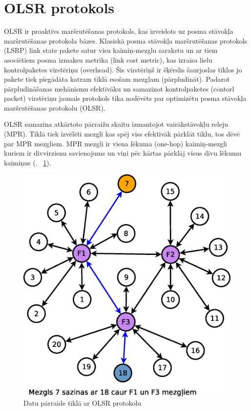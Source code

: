 \section{OLSR protokols}\label{sec:olsr}
\acf{OLSR} ir proaktīvs maršrutēšanas protokols, kas izveidots uz posma stāvokļa maršrutēšanas protokola bāzes. Klasiskā posma stāvokļa maršrutēšanas protokols  (LSRP) link state pakete satur visu kaimiņ-mezglu sarakstu un ar tiem asociētiem posma izmaksu metrika (link cost metric), kas izraisa lielu kontrolpaketes virstēriņu (overhead). Šis virstēriņš ir šķērslis šaurjoslas tīklos jo pakete tiek piegādāta katram tīklā esošam mezglam (pārpludināt). Padarot pārpludināšanas mehānismu efektīvāku un samazinot kontrolpaketes (contorl packet) virstēriņu jaunais protokols tika nodēvēts par optimizētu posma stāvokļa maršrutēšanas protokolu (\acs{OLSR}).

OLSR samazina atkārtoto pārraižu skaitu izmantojot vairākstāvokļu releju (\acs{MPR}). Tīklā tiek izvēlēti mezgli kas spēj viss efektīvāk pārklāt tīklu, tos dēvē par MPR mezgliem. MPR mezgli ir viena lēkuma (one-hop) kaimiņ-mezgli kuriem ir divvirzienu savienojums un viņi pēc kārtas pārklāj visus divu lēkumu kaimiņus (\figurename. ~\ref{fig:olsr}).

\begin{figure}[!htb]
\centering
\includegraphics[scale=0.35]{./graph/olsr}
\caption{Datu pārraide tīklā ar OLSR protokolu}
\label{fig:olsr}
\end{figure}


